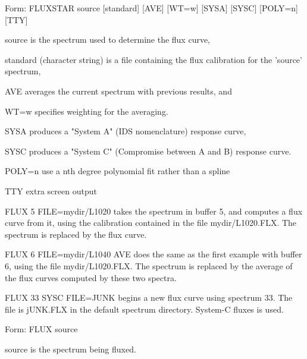 {\newpage\clearpage
{}%
\begin{command}
  \item[Form: FLUXSTAR source {[standard]} {[AVE]} {[WT=w]} {[SYSA]} {[SYSC]}
       {[POLY=n]} {[TTY]}\hfill]{}
  \item[source]{is the spectrum used to determine the flux curve,}
  \item[standard]{(character string) is a file 
       containing the flux calibration for the 'source' spectrum,}
  \item[AVE]{averages the current spectrum with previous results, and}
  \item[WT=w]{specifies weighting for the averaging.}
  \item[SYSA]{produces a "System A" (IDS nomenclature) response curve,}
  \item[SYSC]{produces a "System C" (Compromise between A and B) response 
       curve.}
  \item[POLY=n]{use a nth degree polynomial fit rather than a spline}
  \item[TTY]{extra screen output}
\end{command}%
\lthtmlfigureZ
\lthtmlcheckvsize\clearpage}

{\newpage\clearpage
{}%
\begin{example}
  \item[FLUX 5 FILE=mydir/L1020\hfill]{takes the spectrum in buffer 5, and
       computes a flux curve from it, using the calibration contained in
       the file mydir/L1020.FLX.  The spectrum is replaced by the flux
       curve.}
\par
\item[FLUX 6 FILE=mydir/L1040 AVE\hfill]{does the same as the first
       example with buffer 6, using the file mydir/L1020.FLX.  The spectrum
       is replaced by the average of the flux curves computed by these two
       spectra.}
\par
\item[FLUX 33 SYSC FILE=JUNK\hfill]{begins a new flux curve using
       spectrum 33.  The file is jUNK.FLX in the default spectrum
       directory.  System-C fluxes is used.}
\end{example}%
\lthtmlfigureZ
\lthtmlcheckvsize\clearpage}

{\newpage\clearpage
{}%
\begin{command}
  \item[Form: FLUX source\hfill]{}
  \item[source]{is the spectrum being fluxed.}
\end{command}%
\lthtmlfigureZ
\lthtmlcheckvsize\clearpage}

